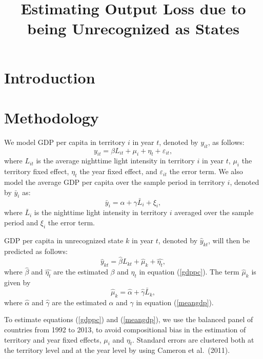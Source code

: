 \documentclass[12pt,a4paper]{article}%
\begin{document}
\title{Estimating Output Loss due to being Unrecognized as States}
\date{}
\maketitle

\section{Introduction}
\section{Methodology}
We model GDP per capita in territory $i$ in year $t$, denoted by $y_{it}$, as follows:
\begin{equation}\label{gdppc}
y_{it} = \beta L_{it} + \mu_i + \eta_t + \varepsilon_{it},
\end{equation}
where $L_{it}$ is the average nighttime light intensity in territory $i$ in year $t$, $\mu_i$ the territory fixed effect, $\eta_t$ the year fixed effect, and $\varepsilon_{it}$ the error term.
We also model the average GDP per capita over the sample period in territory $i$, denoted by $\bar{y}_i$ as:
\begin{equation}\label{meangdp}
\bar{y}_i = \alpha + \gamma \bar{L}_{i} + \xi_{i},
\end{equation}
where $\bar{L}_{i}$ is the nighttime light intensity in territory $i$ averaged over the sample period and $\xi_i$ the error term.

GDP per capita in unrecognized state $k$ in year $t$, denoted by $\hat{y}_{kt}$, will then be predicted as follows:
\begin{equation}
\hat{y}_{kt} = \hat{\beta} L_{kt} + \hat{\mu}_k + \hat{\eta_t},
\end{equation}
where $\hat{\beta}$ and $\hat{\eta_t}$ are the estimated $\beta$ and $\eta_t$ in equation (\ref{gdppc}). The term $\hat{\mu}_k$ is given by
\begin{equation}
\hat{\mu}_k = \hat{\alpha} + \hat{\gamma} \bar{L}_{k},
\end{equation}
where $\hat{\alpha}$ and $\hat{\gamma}$ are the estimated $\alpha$ and $\gamma$ in equation (\ref{meangdp}).

To estimate equations (\ref{gdppc}) and (\ref{meangdp}), we use the balanced panel of countries from 1992 to 2013, to avoid compositional bias in the estimation of territory and year fixed effects, $\mu_i$ and $\eta_t$. 
Standard errors are clustered both at the territory level and at the year level by using Cameron et al.\ (2011).
\end{document}
